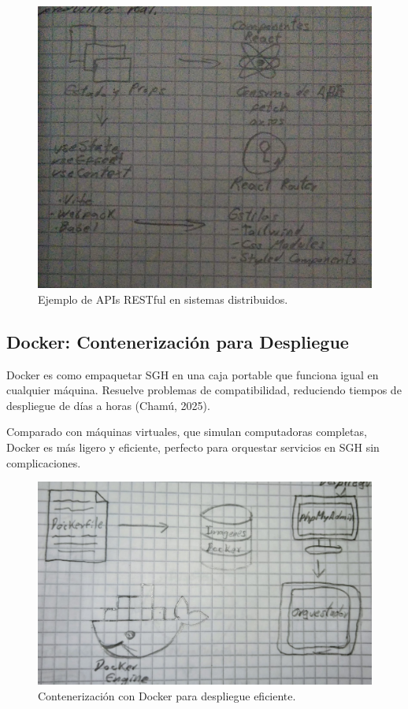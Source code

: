 \begin{figure}[h]
\centering
\includegraphics[width=0.8\columnwidth]{graphics/apis restfull.png}
\caption{Ejemplo de APIs RESTful en sistemas distribuidos.}
\label{fig:apis_restful}
\end{figure}

\subsection{Docker: Contenerización para Despliegue}
Docker es como empaquetar SGH en una caja portable que funciona igual en cualquier máquina. Resuelve problemas de compatibilidad, reduciendo tiempos de despliegue de días a horas (Chamú, 2025).

Comparado con máquinas virtuales, que simulan computadoras completas, Docker es más ligero y eficiente, perfecto para orquestar servicios en SGH sin complicaciones.

\begin{figure}[h]
\centering
\includegraphics[width=0.8\columnwidth]{graphics/docker.png}
\caption{Contenerización con Docker para despliegue eficiente.}
\label{fig:docker}
\end{figure}